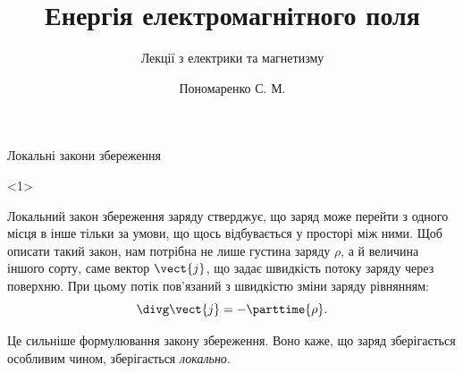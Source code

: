 \documentclass{beamer}
\title[Лекції електрики та магнетизму]{\huge\bfseries Енергія електромагнітного поля}
\subtitle{Лекції з електрики та магнетизму}
\author{Пономаренко С. М.}
\begin{document}
\begin{frame}[plain]
	\maketitle
\end{frame}



\begin{frame}{Локальні закони збереження}{}
	\begin{onlyenv}
		\begin{block}{}\justifying
			Локальний закон збереження заряду стверджує, що заряд може перейти з одного місця в інше тільки за умови, що щось відбувається у просторі між ними. Щоб описати такий закон, нам потрібна не лише густина заряду $ \rho $, а й величина іншого сорту, саме вектор $ \vect{j} $, що задає швидкість потоку заряду через поверхню. При цьому потік пов'язаний з швидкістю зміни заряду рівнянням:
			\begin{equation*}
				\divg\vect{j} = -\parttime{\rho}.
			\end{equation*}

			Це сильніше формулювання закону збереження. Воно каже, що заряд зберігається особливим чином, зберігається \emph{локально}.

			\bigskip


\end{block}
\end{onlyenv}
\end{frame}
\end{document}
